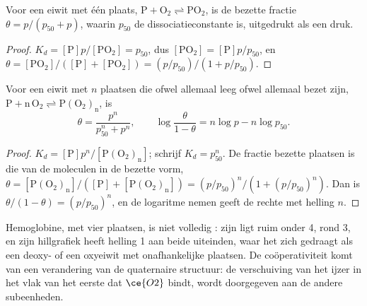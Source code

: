 \begin{proposition}\label{prop:b3:bioinorganic:hyperbola}
Voor een eiwit met één plaats, $\mathrm{P + O_2 \rightleftharpoons PO_2}$, is de bezette fractie $\theta = p/(p_{50} + p)$, waarin $p_{50}$
de dissociatieconstante is, uitgedrukt als een druk.
\end{proposition}

\begin{proof}
$K_d = [\mathrm P]p/[\mathrm{PO_2}] = p_{50}$, dus $[\mathrm{PO_2}] = [\mathrm P]p/p_{50}$, en $\theta = [\mathrm{PO_2}]/([\mathrm P] + [\mathrm{PO_2}]) = (p/p_{50})/(1 + p/p_{50})$.
\end{proof}

\begin{theorem}\label{thm:b3:bioinorganic:hill}
Voor een eiwit met $n$ plaatsen die ofwel allemaal leeg ofwel allemaal bezet zijn,
$\mathrm{P + n\,O_2 \rightleftharpoons P(O_2)_n}$, is
\[
  \theta = \frac{p^n}{p_{50}^n + p^n}, \qquad \log\frac{\theta}{1 - \theta} = n\log p - n\log p_{50}.
\]
\end{theorem}

\begin{proof}
$K_d = [\mathrm P]p^n/[\mathrm{P(O_2)_n}]$; schrijf $K_d = p_{50}^n$. De fractie bezette plaatsen is die van de moleculen
in de bezette vorm, $\theta = [\mathrm{P(O_2)_n}]/([\mathrm P] + [\mathrm{P(O_2)_n}]) = (p/p_{50})^n/(1 + (p/p_{50})^n)$. Dan is $\theta/(1 - \theta) = (p/p_{50})^n$, en de
logaritme nemen geeft de rechte met helling $n$.
\end{proof}

Hemoglobine, met vier plaatsen, is niet volledig : zijn
 ligt ruim onder 4, rond 3, en zijn hillgrafiek heeft
helling 1 aan beide uiteinden, waar het zich gedraagt als een deoxy- of
een oxyeiwit met onafhankelijke plaatsen. De coöperativiteit komt van een
verandering van de quaternaire structuur: de verschuiving van het ijzer
in het vlak van het eerste  dat $\ce{O2}$ bindt, wordt doorgegeven aan de andere subeenheden.

